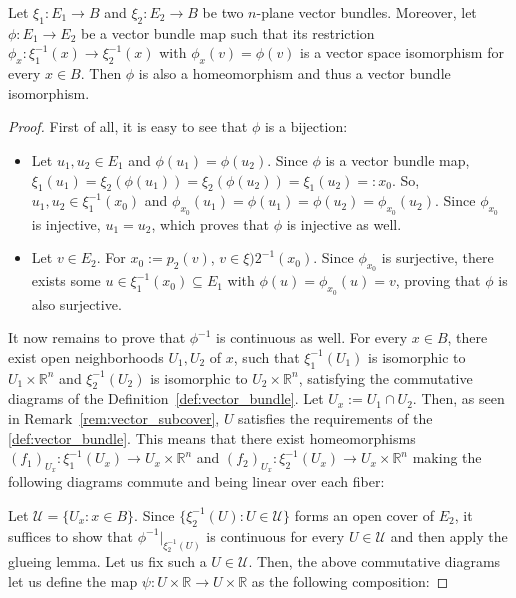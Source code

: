 \begin{proposition}\label{prop:local_to_global_iso_vector} Let $\xi_1:E_1\to B$ and $\xi_2:E_2\to B$ be two $n$-plane vector bundles. Moreover, let $\phi:E_1\to E_2$ be a vector bundle map such that its restriction
$\phi_x:\xi_1^{-1}(x)\to\xi_2^{-1}(x)$
with $\phi_x(v)=\phi(v)$ is a vector space isomorphism for every $x\in B$. Then $\phi$ is also a homeomorphism and thus a vector bundle isomorphism.
\end{proposition}
\begin{proof} First of all, it is easy to see that $\phi$ is a bijection:
\begin{itemize}
\item Let $u_1,u_2\in E_1$ and $\phi(u_1)=\phi(u_2)$. Since $\phi$ is a vector bundle map, 
$\xi_1(u_1)=\xi_2(\phi(u_1))=\xi_2(\phi(u_2))=\xi_1(u_2)=:x_0$.
So, $u_1,u_2\in\xi_1^{-1}(x_0)$ and $\phi_{x_0}(u_1)=\phi(u_1)=\phi(u_2)=\phi_{x_0}(u_2)$. Since $\phi_{x_0}$ is injective, $u_1=u_2$, which proves that $\phi$ is injective as well.
\item Let $v\in E_2$. For $x_0:=p_2(v)$, $v\in\xi)2^{-1}(x_0)$. Since $\phi_{x_0}$ is surjective, there exists some $u\in\xi_1^{-1}(x_0)\subseteq E_1$ with $\phi(u)=\phi_{x_0}(u)=v$, proving that $\phi$ is also surjective.
\end{itemize}
It now remains to prove that $\phi^{-1}$ is continuous as well. For every $x\in B$, there exist open neighborhoods $U_1,U_2$ of $x$, such that $\xi_1^{-1}(U_1)$ is isomorphic to $U_1\times\mathbb{R}^n$ and $\xi_2^{-1}(U_2)$ is isomorphic to $U_2\times\mathbb{R}^n$, satisfying the commutative diagrams of the Definition~\ref{def:vector_bundle}. Let $U_x:=U_1\cap U_2$. Then, as seen in Remark~\ref{rem:vector_subcover}, $U$ satisfies the requirements of the \ref{def:vector_bundle}. This means that there exist homeomorphisms $(f_1)_{U_x}:\xi_1^{-1}(U_x)\to U_x\times\mathbb{R}^n$ and $(f_2)_{U_x}:\xi_2^{-1}(U_x)\to U_x\times\mathbb{R}^n$ making the following diagrams commute and being linear over each fiber:
\begin{center}
\end{center}
Let $\mathcal{U}=\{U_x:x\in B\}$. Since $\{\xi_2^{-1}(U):U\in\mathcal{U}\}$ forms an open cover of $E_2$, it suffices to show that $\phi^{-1}|_{\xi_2^{-1}(U)}$ is continuous for every $U\in\mathcal{U}$ and then apply the glueing lemma. Let us fix such a $U\in\mathcal{U}$. Then, the above commutative diagrams let us define the map $\psi:U\times\mathbb{R}\to U\times\mathbb{R}$ as the following composition:

\end{proof}
